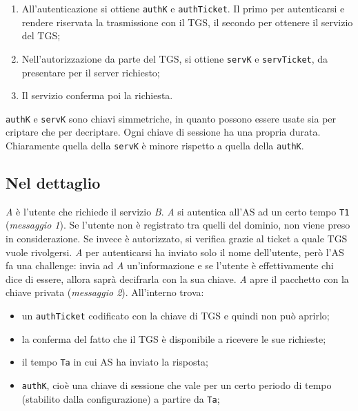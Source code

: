 \begin{enumerate}
      \item All'autenticazione si ottiene \verb|authK| e \verb|authTicket|.
            Il primo per autenticarsi e rendere
            riservata la trasmissione con il TGS, il secondo per ottenere
            il servizio del TGS;
      \item Nell'autorizzazione da parte del TGS, si ottiene \verb|servK| e
            \verb|servTicket|, da presentare per il
            server richiesto;
      \item Il servizio conferma poi la richiesta.
\end{enumerate}

\verb|authK| e \verb|servK| sono chiavi simmetriche, in quanto possono essere
usate sia per criptare che per decriptare. Ogni chiave di sessione ha una
propria durata.
Chiaramente quella della \verb|servK| è minore rispetto a quella
della \verb|authK|.

\subsection{Nel dettaglio}

\textit{A} è l'utente che richiede il servizio \textit{B}.
\textit{A} si autentica all'AS ad un certo tempo \verb|T1|
(\textit{messaggio 1}). Se l'utente non è registrato tra quelli del dominio,
non viene preso in considerazione. Se invece è autorizzato, si verifica grazie
al ticket a quale TGS vuole rivolgersi.
\textit{A} per autenticarsi ha inviato solo il nome dell'utente, però l'AS fa
una challenge: invia ad \textit{A} un'informazione e se l'utente è
effettivamente chi dice di essere, allora saprà decifrarla con la sua chiave.
\textit{A} apre il pacchetto con la chiave privata (\textit{messaggio 2}).
All'interno trova:

\begin{itemize}
      \item un \verb|authTicket| codificato con la chiave di TGS e quindi non può
            aprirlo;
      \item la conferma del fatto che il TGS è disponibile a ricevere le sue
            richieste;
      \item il tempo \verb|Ta| in cui AS ha inviato la risposta;
      \item \verb|authK|, cioè una chiave di sessione che vale per un certo periodo di
            tempo (stabilito dalla configurazione) a partire da \verb|Ta|;
\end{itemize}

